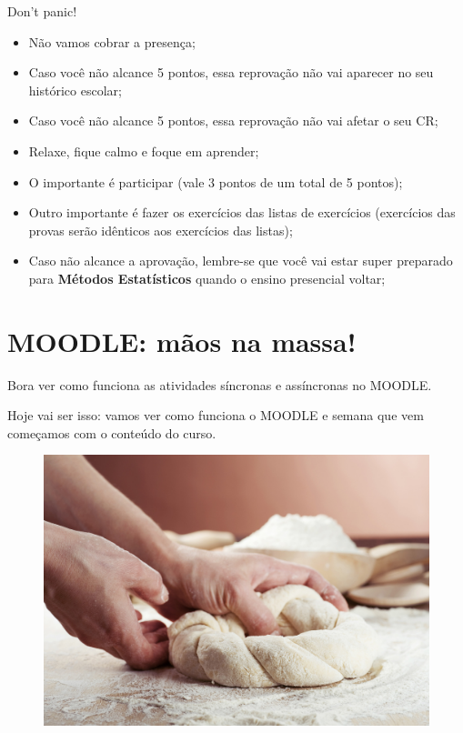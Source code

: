 \documentclass[9pt]{beamer}
\begin{document}
\begin{frame}{Don't panic!}

\begin{itemize}
	\item Não vamos cobrar a presença;
	\vfill
	
	\item Caso você não alcance 5 pontos, essa reprovação não vai aparecer no seu histórico escolar;
	\vfill
	
	\item Caso você não alcance 5 pontos, essa reprovação não vai afetar o seu CR;
	\vfill
	
	\item Relaxe, fique calmo e foque em aprender;
	\vfill
	
	\item O importante é participar (vale 3 pontos de um total de 5 pontos);
	\vfill
	
	\item Outro importante é fazer os exercícios das listas de exercícios (exercícios das provas serão idênticos aos exercícios das listas);
	\vfill
	
	\item Caso não alcance a aprovação, lembre-se que você vai estar super preparado para {\bf Métodos Estatísticos} quando o ensino presencial voltar;
\end{itemize}

\end{frame}

\section{MOODLE: mãos na massa!}

\begin{frame}{}

Bora ver como funciona as atividades síncronas e assíncronas no MOODLE. 
\vfill

Hoje vai ser isso: vamos ver como funciona o MOODLE e semana que vem começamos com o conteúdo do curso.

\begin{figure}[!htbp]
	\centering
	\includegraphics[width=0.75\linewidth]{oficina_de_macarrao_caseiro.jpg}
\end{figure}

\end{frame}
\end{document}
